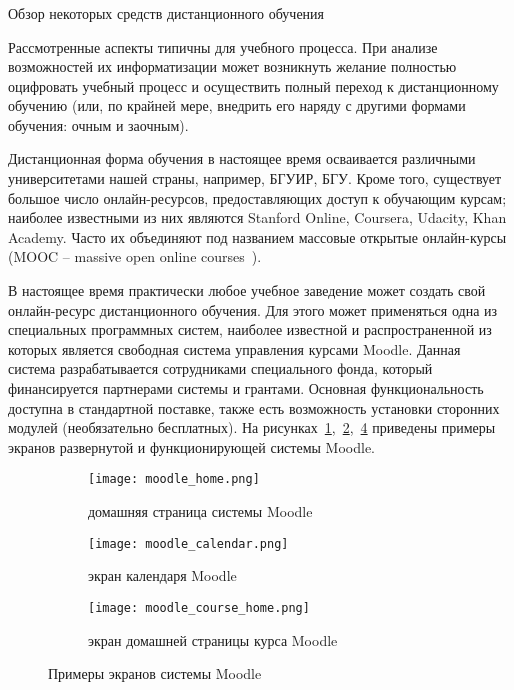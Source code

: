 \subsubsection{} Обзор некоторых средств дистанционного обучения
\label{sec:analysis:analogues:mooc}

Рассмотренные аспекты типичны для учебного процесса. При анализе возможностей их информатизации может возникнуть желание полностью оцифровать учебный процесс и осуществить полный переход к дистанционному обучению (или, по крайней мере, внедрить его наряду с другими формами обучения: очным и заочным). 

Дистанционная форма обучения в настоящее время осваивается различными университетами нашей страны, например, БГУИР, БГУ. Кроме того, существует большое число онлайн-ресурсов, предоставляющих доступ к обучающим курсам; наиболее известными из них являются Stanford Online, Coursera, Udacity, Khan Academy. Часто их объединяют под названием массовые открытые онлайн-курсы (MOOC -- massive open online courses~\cite{mooc_model}). 

В настоящее время практически любое учебное заведение может создать свой онлайн-ресурс дистанционного обучения. Для этого может применяться одна из специальных программных систем, наиболее известной и распространенной из которых является свободная система управления курсами Moodle. Данная система разрабатывается сотрудниками специального фонда, который финансируется партнерами системы и грантами. Основная функциональность доступна в стандартной поставке, также есть возможность установки сторонних модулей (необязательно бесплатных). На рисунках~\ref{fig:analysis:analogues:moodle_home},~\ref{fig:analysis:analogues:moodle_calendar},~\ref{fig:analysis:analogues:moodle_course_home} приведены примеры экранов развернутой и функционирующей системы Moodle.

\begin{figure}
\centering
	\begin{subfigure}[ht]{0.85\textwidth}
	    \centering
		\texttt{[image: moodle\_home.png]}
		\caption{домашняя страница системы Moodle}
		\label{fig:analysis:analogues:moodle_home}
	\end{subfigure}
	\begin{subfigure}[ht]{0.85\textwidth}
	    \centering
		\texttt{[image: moodle\_calendar.png]}
		\caption{экран календаря Moodle}
		\label{fig:analysis:analogues:moodle_calendar}
	\end{subfigure}
	\begin{subfigure}[ht]{0.85\textwidth}
	    \centering
		\texttt{[image: moodle\_course\_home.png]} 
		\caption{экран домашней страницы курса Moodle}
		\label{fig:analysis:analogues:moodle_course_home}
	\end{subfigure}
	\caption{Примеры экранов системы Moodle}
\end{figure}

